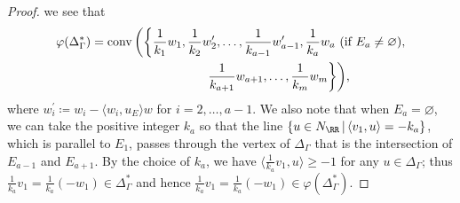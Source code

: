 \begin{proof}
we see that
\begin{gather}
\varphi(\Delta_\Gamma^*)=\operatorname{conv}\bigg(\bigg\{\frac{1}{k_1}w_1,\frac{1}{k_2}w_2^\prime,\dots,\frac{1}{k_{a-1}}w_{a-1}^\prime,
\frac{1}{k_a}w_a \ \text{(if $E_a\neq\varnothing$)}, \nonumber\\
\hphantom{\varphi(\Delta_\Gamma^*)=\operatorname{conv}\bigg(\bigg\{}{}
\frac{1}{k_{a+1}}w_{a+1}, \dots,\frac{1}{k_m}w_m\bigg\}\bigg),\label{generating_set_dual}
\end{gather}
where $w_i^\prime\coloneqq w_i-\langle w_i,u_E\rangle w$ for $i=2,\dots,a-1$.
We also note that when $E_a=\varnothing$, we can take the positive integer $k_a$ so that the line $\{u\in N_\RR\,|\,\langle v_1,u\rangle= -k_a\}$, which is parallel to $E_1$, passes through the vertex of $\Delta_\Gamma$ that is the intersection of $E_{a-1}$ and $E_{a+1}$.
By the choice of $k_a$, we have $\langle \frac{1}{k_a}v_1,u\rangle\ge -1$ for any $u\in \Delta_\Gamma$; thus $\frac{1}{k_a}v_1=\frac{1}{k_a}(-w_1)\in\Delta_\Gamma^*$ and hence $\frac{1}{k_a}v_1=\frac{1}{k_a}(-w_1)\in\varphi(\Delta_\Gamma^*)$.


\end{proof}
